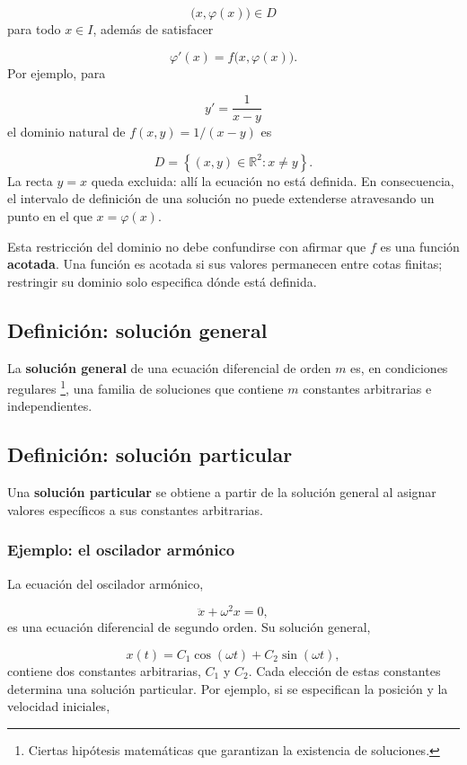 \documentclass[12pt,a4paper]{article}
\begin{document}
	\[
	\bigl(x,\varphi(x)\bigr)\in D
	\]
	para todo \(x\in I\), además de satisfacer
	
	\[
	\varphi'(x)=f\bigl(x,\varphi(x)\bigr).
	\]
	Por ejemplo, para
	
	\[
	y'=\frac{1}{x-y}
	\]
	el dominio natural de \(f(x,y)=1/(x-y)\) es
	
	\[
	D=\left\{(x,y)\in\mathbb{R}^2:x\neq y\right\}.
	\]
	La recta \(y=x\) queda excluida: allí la ecuación no está definida. En consecuencia, el intervalo de definición de una solución no puede extenderse atravesando un punto en el que \(x=\varphi(x)\).
	
	Esta restricción del dominio no debe confundirse con afirmar que \(f\) es una función \textbf{acotada}. Una función es acotada si sus valores permanecen entre cotas finitas; restringir su dominio solo especifica dónde está definida.
	
	\subsection{Definición: solución general}
	
	La \textbf{solución general} de una ecuación diferencial de orden \(m\) es, en condiciones regulares \footnote{Ciertas hipótesis matemáticas que garantizan la existencia de soluciones.}, una familia de soluciones que contiene \(m\) constantes arbitrarias e independientes.
	
	\subsection{Definición: solución particular}
	
	Una \textbf{solución particular} se obtiene a partir de la solución general al asignar valores específicos a sus constantes arbitrarias.
	
	\subsubsection*{Ejemplo: el oscilador armónico}
	
	La ecuación del oscilador armónico,
	
	\[
	\ddot{x}+\omega^2x=0,
	\]
	es una ecuación diferencial de segundo orden. Su solución general,
	
	\[
	x(t)=C_1\cos(\omega t)+C_2\sin(\omega t),
	\]
	contiene dos constantes arbitrarias, \(C_1\) y \(C_2\). Cada elección de estas constantes determina una solución particular. Por ejemplo, si se especifican la posición y la velocidad iniciales,
	
\end{document}
